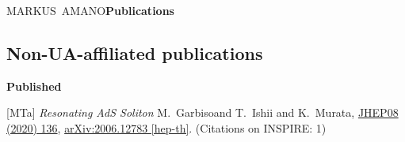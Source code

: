 \documentclass[12pt,letter]{article}
\begin{document}
\begin{cv}{\large MARKUS~AMANO\hfill {\bf \small Publications}}
\begin{cvlist}{}
\section*{Non-UA-affiliated publications}
%
\item[ \bf Published] {}
%
\item[{[MTa]}]  
{\it Resonating AdS Soliton}
\newline M.~Garbiso\footnotemark[1] and T.~Ishii and K.~Murata,
\newline \href{https://doi.org/10.1007/JHEP08(2020)136}{JHEP08 (2020) 136},
\newline \href{https://arxiv.org/abs/2006.12783}{arXiv:2006.12783 [hep-th]}.
(Citations on INSPIRE: 1)
%
\end{cvlist}
%
\end{cv}
\end{document}
